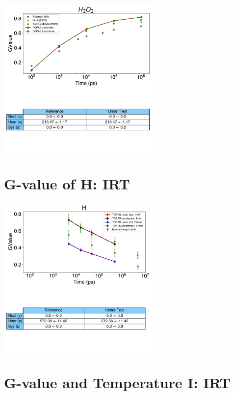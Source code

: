 \documentclass[aspectratio=1610]{beamer}
\begin{document}
\begin{frame}{\secname}
 \centering
  \includegraphics[width=0.6\textwidth]{./GvalueIRT_H2O2/TimeEvolution}
\end{frame}

\section{G-value of H: IRT}

\begin{frame}{\secname}
 \centering
  \includegraphics[width=0.6\textwidth]{./GvalueIRT_H/TimeEvolution}
\end{frame}

\section{G-value and Temperature I: IRT}
\end{document}
